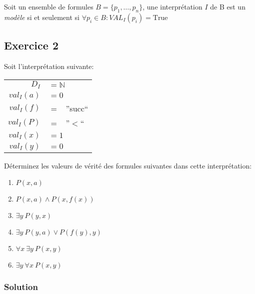     Soit un ensemble de formules $B=\{p_1,\dots ,p_n\}$, une interprétation $I$ de B est un \textit{modèle} si et seulement si $\forall p_i \in B:VAL_I(p_i) = \text{True}$

\subsection*{Exercice 2}
Soit l'interprétation suivante:
\begin{center}
\begin{tabular}{r l}
$D_I$ & $= \mathbb{N}$ \\
$val_I(a)$ & $= 0$ \\
$val_I(f)$ & $= $ \ ''succ`` \\
$val_I(P)$ & $= $ \ ''$<$`` \\
$val_I(x)$ & $= 1$ \\
$val_I(y)$ & $= 0$ \\
\end{tabular}
\end{center}
Déterminez les valeurs de vérité des formules suivantes dans cette interprétation:
\begin{enumerate}
\item $P(x, a)$
\item $P(x, a) \land P(x, f(x))$
\item $\exists y \ P(y, x)$
\item $\exists y \ P(y, a) \vee P(f(y), y)$
\item $\forall x \ \exists y \ P(x, y)$
\item $\exists y \ \forall x \ P(x, y)$
\end{enumerate}

    \subsubsection*{Solution}
    
